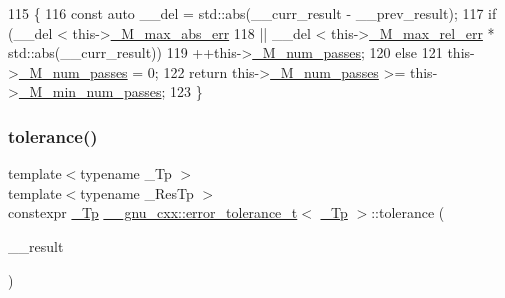 \begin{DoxyCode}
115         \{
116           \textcolor{keyword}{const} \textcolor{keyword}{auto} \_\_del = std::abs(\_\_curr\_result - \_\_prev\_result);
117           \textcolor{keywordflow}{if} (\_\_del < this->\hyperlink{struct____gnu__cxx_1_1error__tolerance__t_a55773fc8e99f5906ba9a2b2f03a141fb}{\_M\_max\_abs\_err}
118               || \_\_del < this->\hyperlink{struct____gnu__cxx_1_1error__tolerance__t_add7d7bfa6c6f5c36f50dde1497486e9e}{\_M\_max\_rel\_err} * std::abs(\_\_curr\_result))
119             ++this->\hyperlink{struct____gnu__cxx_1_1error__tolerance__t_aa3f36e75dc6dd3c6d8283ffa18f78056}{\_M\_num\_passes};
120           \textcolor{keywordflow}{else}
121             this->\hyperlink{struct____gnu__cxx_1_1error__tolerance__t_aa3f36e75dc6dd3c6d8283ffa18f78056}{\_M\_num\_passes} = 0;
122           \textcolor{keywordflow}{return} this->\hyperlink{struct____gnu__cxx_1_1error__tolerance__t_aa3f36e75dc6dd3c6d8283ffa18f78056}{\_M\_num\_passes} >= this->\hyperlink{struct____gnu__cxx_1_1error__tolerance__t_a395bb8004b293af143b531ec6de046f0}{\_M\_min\_num\_passes};
123         \}
\end{DoxyCode}
\mbox{\label{struct____gnu__cxx_1_1error__tolerance__t_a2564721b5a7aae5f2a74703dd4c5248a}} 
\subsubsection{\texorpdfstring{tolerance()}{tolerance()}\hspace{0.1cm}{\footnotesize\ttfamily [1/2]}}
{\footnotesize\ttfamily template$<$typename \+\_\+\+Tp $>$ \\
template$<$typename \+\_\+\+Res\+Tp $>$ \\
constexpr \hyperlink{namespace____gnu__cxx_a3b19a9c800ca194374ef9172290f7d79}{\+\_\+\+Tp} \hyperlink{struct____gnu__cxx_1_1error__tolerance__t}{\+\_\+\+\_\+gnu\+\_\+cxx\+::error\+\_\+tolerance\+\_\+t}$<$ \hyperlink{namespace____gnu__cxx_a3b19a9c800ca194374ef9172290f7d79}{\+\_\+\+Tp} $>$\+::tolerance (\begin{DoxyParamCaption}\item[{\+\_\+\+Res\+Tp}]{\+\_\+\+\_\+result }\end{DoxyParamCaption})\hspace{0.3cm}{\ttfamily [inline]}}



